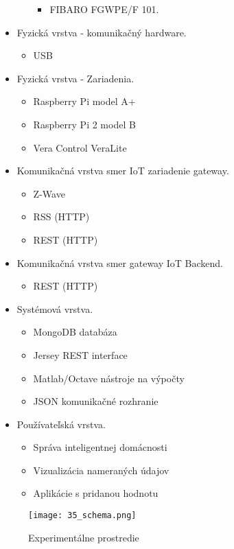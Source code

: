 \begin{itemize}
\begin{itemize}
\begin{itemize}
        \item FIBARO FGWPE/F 101.         
       \end{itemize}     
  \end{itemize}  
\item Fyzická vrstva - komunikačný hardware.
  \begin{itemize}
    \item USB
  \end{itemize}    
\item Fyzická vrstva - Zariadenia.
  \begin{itemize}
    \item Raspberry Pi model A+
    \item Raspberry Pi 2 model B    
    \item Vera Control VeraLite
  \end{itemize}  
\item Komunikačná vrstva smer IoT zariadenie gateway.
  \begin{itemize}
    \item Z-Wave
    \item RSS (HTTP)
    \item REST (HTTP)    
  \end{itemize}    
\item Komunikačná vrstva smer gateway IoT Backend.
  \begin{itemize}
    \item REST (HTTP)
  \end{itemize} 
\item Systémová vrstva.
  \begin{itemize}
    \item MongoDB databáza 
    \item Jersey REST interface
    \item Matlab/Octave  nástroje na výpočty     
    \item JSON komunikačné rozhranie
  \end{itemize}           
\item Používateľská vrstva.
  \begin{itemize}
    \item Správa inteligentnej domácnosti
    \item Vizualizácia nameraných údajov 
    \item Aplikácie s pridanou hodnotu 
  \end{itemize}         
\end{itemize}
\begin{figure}[!htbp]
\centering
\texttt{[image: 35\_schema.png]}
\caption{Experimentálne prostredie}
\label{35_schema}
\end{figure} 
